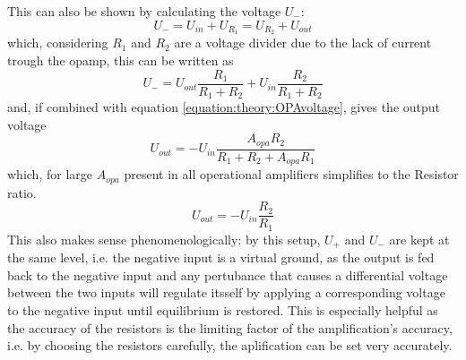                 This can also be shown by calculating the voltage $U_-$:
                \begin{equation}
                    U_- = U_{in} + U_{R_1} = U_{R_2} + U_{out}
                \end{equation}
                which, considering $R_1$ and $R_2$ are a voltage divider due to the lack of current trough the opamp, this can be written as
                \begin{equation}
                    U_{-} = U_{out} \frac{R_1}{R_1+R_2} + U_{in} \frac{R_2}{R_1+R_2}
                \end{equation}
                and, if combined with equation \ref{equation:theory:OPAvoltage}, gives the output voltage
                \begin{equation}
                    U_{out} = -U_{in} \frac{A_{opa}R_2}{R_1+R_2 + A_{opa}R_1}
                \end{equation}
                which, for large $A_{opa}$ present in all operational amplifiers simplifies to the Resistor ratio.
                \begin{equation}
                    U_{out} = -U_{in}\frac{R_2}{R_1}
                \end{equation}
                This also makes sense phenomenologically: by this setup, $U_{+}$ and $U_{-}$ are kept at the same level, i.e. the negative input is a virtual ground, as the output is fed back to the negative input and any pertubance that causes a differential voltage between the two inputs will regulate itsself by applying a corresponding voltage to the negative input until equilibrium is restored.
                This is especially helpful as the accuracy of the resistors is the limiting factor of the amplification's accuracy, i.e. by choosing the resistors carefully, the aplification can be set very accurately.

